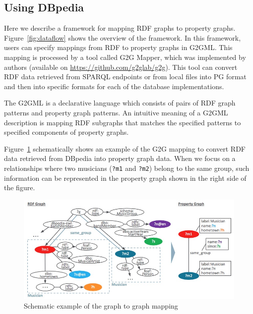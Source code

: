\documentclass[runningheads]{llncs}
\begin{document}
\subsection{Using DBpedia}

Here we describe a framework for mapping RDF graphs to property graphs.
Figure~\ref{fig:dataflow} shows the overview of the framework.
In this framework, users can specify mappings from RDF to property graphs in G2GML.
This mapping is processed by a tool called G2G Mapper, which was implemented by authors (available on \url{https://github.com/g2glab/g2g}). This tool can convert RDF data retrieved from SPARQL endpoints or from local files into PG format and then into specific formats for each of the database implementations.

The G2GML is a declarative language which consists of pairs of RDF graph patterns and property graph patterns. 
An intuitive meaning of a G2GML description is mapping RDF subgraphs that matches the specified patterns to specified components of property graphs. 




Figure~\ref{fig:conversion} schematically shows an example of the G2G mapping to convert RDF data retrieved from DBpedia into property graph data. 
When we focus on a relationships where two musicians (\texttt{?m1} and \texttt{?m2}) belong to the same group, such information can be represented in the property graph shown in the right side of the figure.

\begin{figure}
\center
\includegraphics[width=1.0\textwidth]{example.jpg}
\caption{Schematic example of the graph to graph mapping}
\label{fig:conversion}
\end{figure}
\end{document}
